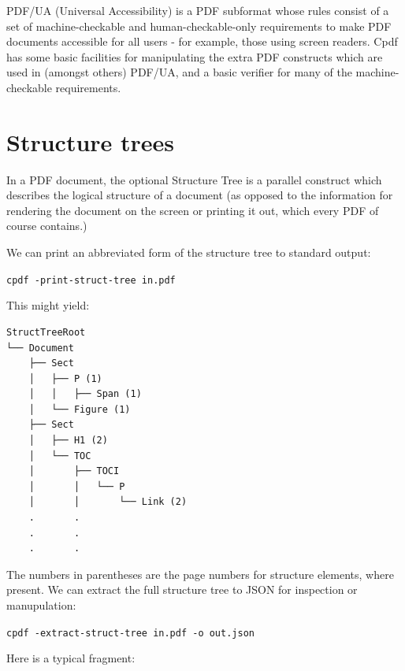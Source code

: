 \documentclass{book}
\newcommand{\smallgap}{\bigskip}
\begin{document}
PDF/UA (Universal Accessibility) is a PDF subformat whose rules consist of a set of machine-checkable and human-checkable-only requirements to make PDF documents accessible for all users - for example, those using screen readers. Cpdf has some basic facilities for manipulating the extra PDF constructs which are used in (amongst others) PDF/UA, and a basic verifier for many of the machine-checkable requirements.

\section{Structure trees}

In a PDF document, the optional Structure Tree is a parallel construct which describes the logical structure of a document (as opposed to the information for rendering the document on the screen or printing it out, which every PDF of course contains.)

We can print an abbreviated form of the structure tree to standard output:

  \begin{framed}
    \noindent\small\verb!cpdf -print-struct-tree in.pdf!
  \end{framed}

\noindent This might yield:

\begin{minipage}{\linewidth}
\begin{framed}
\begin{verbatim}
StructTreeRoot
└── Document
    ├── Sect
    │   ├── P (1)
    │   │   ├── Span (1)
    │   └── Figure (1)
    ├── Sect
    │   ├── H1 (2)
    │   └── TOC
    │       ├── TOCI
    │       │   └── P
    │       │       └── Link (2)
    .       .
    .       .
    .       .
\end{verbatim}
\end{framed}
\end{minipage}

\smallgap 
\noindent The numbers in parentheses are the page numbers for structure elements, where present. We can extract the full structure tree to JSON for inspection or manupulation:

  \begin{framed}
    \noindent\small\verb!cpdf -extract-struct-tree in.pdf -o out.json!
  \end{framed}

\noindent Here is a typical fragment:
\end{document}
